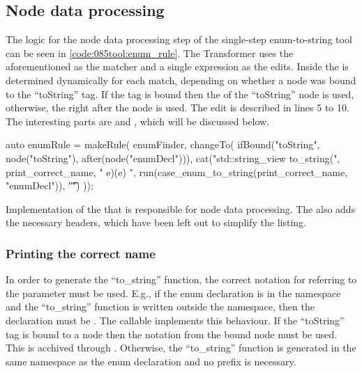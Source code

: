 \subsection{Node data processing} \label{subsec:080dev:085example:050enum:node_processing}
The logic for the node data processing step of the single-step enum-to-string tool can be seen in \cref{code:085tool:enum_rule}.
The Transformer uses the aforementioned  as the matcher and a single  expression as the edits.
Inside  the  is determined dynamically for each match, depending on whether a node was bound to the ``toString'' tag. If the tag is bound then the  of the ``toString'' node is used, otherwise, the  right after the  node is used.
The edit is described in lines 5 to 10. The interesting parts are  and , which will be discussed below.

\begin{listing}[H]
    \begin{cppcode}
auto enumRule = makeRule(
    enumFinder,
    changeTo(
        ifBound("toString", node("toString"), after(node("enumDecl"))),
        cat("\n\nconstexpr std::string_view to_string(",
            print_correct_name,
            " e){\n\tswitch(e) {\n",
            run(case_enum_to_string(print_correct_name, "enumDecl")),
            "\t}\n}")
    ));
    \end{cppcode}
    \caption{Implementation of the  that is responsible for node data processing. The  also adds the necessary headers, which have been left out to simplify the listing.}
    \label{code:085tool:enum_rule}
\end{listing}

\subsubsection*{Printing the correct name}
In order to generate the ``to\_string'' function, the correct notation for referring to the parameter must be used. E.g., if the enum declaration  is in the namespace  and the ``to\_string'' function is written outside the namespace, then the declaration must be .
The callable  implements this behaviour.
If the ``toString'' tag is bound to a node then the notation from the bound node must be used. This is acchived through .
Otherwise, the ``to\_string'' function is generated in the same namespace as the enum declaration and no prefix is necessary.

